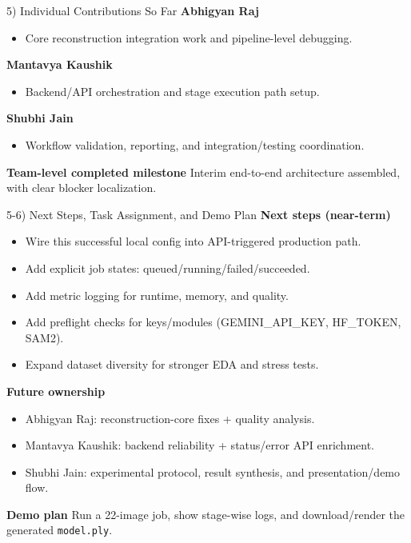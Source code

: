 \documentclass[aspectratio=169]{beamer}
\begin{document}
\begin{frame}{5) Individual Contributions So Far}
\textbf{Abhigyan Raj}
\begin{itemize}
  \item Core reconstruction integration work and pipeline-level debugging.
\end{itemize}

\textbf{Mantavya Kaushik}
\begin{itemize}
  \item Backend/API orchestration and stage execution path setup.
\end{itemize}

\textbf{Shubhi Jain}
\begin{itemize}
  \item Workflow validation, reporting, and integration/testing coordination.
\end{itemize}

\vspace{0.5em}
\textbf{Team-level completed milestone}
Interim end-to-end architecture assembled, with clear blocker localization.
\end{frame}

\begin{frame}{5-6) Next Steps, Task Assignment, and Demo Plan}
\textbf{Next steps (near-term)}
\begin{itemize}
  \item Wire this successful local config into API-triggered production path.
  \item Add explicit job states: queued/running/failed/succeeded.
  \item Add metric logging for runtime, memory, and quality.
  \item Add preflight checks for keys/modules (GEMINI\_API\_KEY, HF\_TOKEN, SAM2).
  \item Expand dataset diversity for stronger EDA and stress tests.
\end{itemize}

\vspace{0.5em}
\textbf{Future ownership}
\begin{itemize}
  \item Abhigyan Raj: reconstruction-core fixes + quality analysis.
  \item Mantavya Kaushik: backend reliability + status/error API enrichment.
  \item Shubhi Jain: experimental protocol, result synthesis, and presentation/demo flow.
\end{itemize}

\vspace{0.5em}
\textbf{Demo plan}
Run a 22-image job, show stage-wise logs, and download/render the generated \texttt{model.ply}.
\end{frame}
\end{document}
